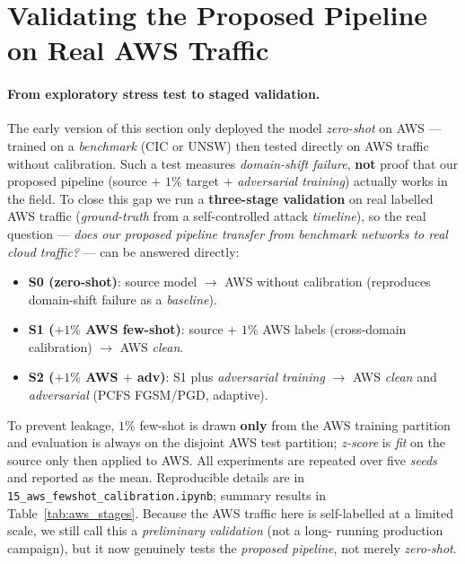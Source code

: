 \documentclass[preprint,12pt,authoryear]{elsarticle}
\begin{document}
\section{Validating the Proposed Pipeline on Real AWS Traffic}
\label{sec:aws}

\paragraph{From exploratory stress test to staged validation.} The early version of
this section only deployed the model \emph{zero-shot} on AWS --- trained on a
\emph{benchmark} (CIC or UNSW) then tested directly on AWS traffic without
calibration. Such a test measures \emph{domain-shift failure}, \textbf{not} proof
that our proposed pipeline (source $+$ $1\%$ target $+$ \emph{adversarial training})
actually works in the field. To close this gap we run a \textbf{three-stage
validation} on real labelled AWS traffic (\emph{ground-truth} from a self-controlled
attack \emph{timeline}), so the real question --- \emph{does our proposed pipeline
transfer from benchmark networks to real cloud traffic?} --- can be answered
directly:
\begin{itemize}
  \item \textbf{S0 (zero-shot)}: source model $\rightarrow$ AWS without calibration
  (reproduces domain-shift failure as a \emph{baseline}).
  \item \textbf{S1 ($+1\%$ AWS few-shot)}: source $+$ $1\%$ AWS labels (cross-domain
  calibration) $\rightarrow$ AWS \emph{clean}.
  \item \textbf{S2 ($+1\%$ AWS $+$ adv)}: S1 plus \emph{adversarial training}
  $\rightarrow$ AWS \emph{clean} and \emph{adversarial} (PCFS FGSM/PGD, adaptive).
\end{itemize}
To prevent leakage, $1\%$ few-shot is drawn \textbf{only} from the AWS training
partition and evaluation is always on the disjoint AWS test partition;
\emph{z-score} is \emph{fit} on the source only then applied to AWS. All experiments
are repeated over five \emph{seeds} and reported as the mean. Reproducible details
are in \texttt{15\_aws\_fewshot\_calibration.ipynb}; summary results in
Table~\ref{tab:aws_stages}. Because the AWS traffic here is self-labelled at a
limited scale, we still call this a \emph{preliminary validation} (not a long-
running production campaign), but it now genuinely tests the \emph{proposed
pipeline}, not merely \emph{zero-shot}.
\end{document}
